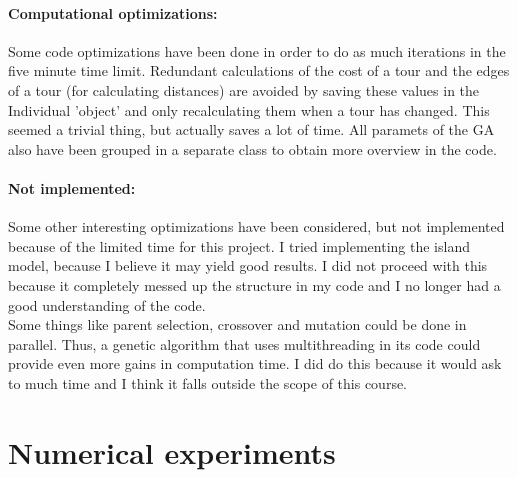 \documentclass[a4paper,10pt]{article}
\newcommand{\ReplaceMe}[1]{{\color{blue}#1}}
\newcommand{\RemoveMe}[1]{{\color{purple}#1}}
\begin{document}
\paragraph{Computational optimizations:} Some code optimizations have been done in order to do as much iterations in the five minute time limit. Redundant calculations of the cost of a tour and the edges of a tour (for calculating distances) are avoided by saving these values in the Individual 'object' and only recalculating them when a tour has changed. This seemed a trivial thing, but actually saves a lot of time. All paramets of the GA also have been grouped in a separate class to obtain more overview in the code. 

\paragraph{Not implemented:} Some other interesting optimizations have been considered, but not implemented because of the limited time for this project. I tried implementing the island model, because I believe it may yield good results. I did not proceed with this because it completely messed up the structure in my code and I no longer had a good understanding of the code. \\

Some things like parent selection, crossover and mutation could be done in parallel. Thus, a genetic algorithm that uses multithreading in its code could provide even more gains in computation time. I did do this because it would ask to much time and I think it falls outside the scope of this course. 



\section{Numerical experiments}

\end{document}
